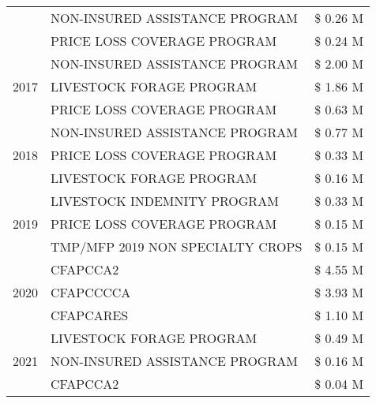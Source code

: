 \begin{tabular}{llr}
 & NON-INSURED ASSISTANCE PROGRAM & \$ 0.26 M \\
 & PRICE LOSS COVERAGE PROGRAM & \$ 0.24 M \\
\cline{1-3}
\multirow[t]{3}{*}{2017} & NON-INSURED ASSISTANCE PROGRAM & \$ 2.00 M \\
 & LIVESTOCK FORAGE PROGRAM & \$ 1.86 M \\
 & PRICE LOSS COVERAGE PROGRAM & \$ 0.63 M \\
\cline{1-3}
\multirow[t]{3}{*}{2018} & NON-INSURED ASSISTANCE PROGRAM & \$ 0.77 M \\
 & PRICE LOSS COVERAGE PROGRAM & \$ 0.33 M \\
 & LIVESTOCK FORAGE PROGRAM & \$ 0.16 M \\
\cline{1-3}
\multirow[t]{3}{*}{2019} & LIVESTOCK INDEMNITY PROGRAM & \$ 0.33 M \\
 & PRICE LOSS COVERAGE PROGRAM & \$ 0.15 M \\
 & TMP/MFP 2019 NON SPECIALTY CROPS & \$ 0.15 M \\
\cline{1-3}
\multirow[t]{3}{*}{2020} & CFAPCCA2 & \$ 4.55 M \\
 & CFAPCCCCA & \$ 3.93 M \\
 & CFAPCARES & \$ 1.10 M \\
\cline{1-3}
\multirow[t]{3}{*}{2021} & LIVESTOCK FORAGE PROGRAM & \$ 0.49 M \\
 & NON-INSURED ASSISTANCE PROGRAM & \$ 0.16 M \\
 & CFAPCCA2 & \$ 0.04 M \\
\cline{1-3}
\bottomrule
\end{tabular}
